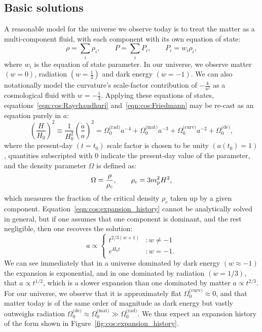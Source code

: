 \subsection{Basic solutions}
A reasonable model for the universe we observe today is to treat the matter as a multi-component fluid, with each component with its own equation of state:
\begin{equation}
  \rho = \sum_i \rho_i, \qquad P = \sum_i P_i, \qquad P_i = w_i \rho_i,
  \label{eqn:cos:multi_component}
\end{equation}
where \(w_i\) is the equation of state parameter. In our universe, we observe matter \((w=0)\), radiation \((w=\frac{1}{3})\) and dark energy \((w=-1)\). We can also notationally model the curvature's scale-factor contribution of \(-\frac{k}{a^2}\) as a cosmological fluid with \(w=-\frac{1}{3}\). Applying these equations of states, equations~\eqref{eqn:cos:Raychaudhuri} and~\eqref{eqn:cos:Friedmann} may be re-cast as an equation purely in \(a\):
\begin{equation}
  {\left( \frac{H}{H_0} \right)}^2 \equiv 
  \frac{1}{H_0^2}{\left( \frac{\dot{a}}{a} \right)}^2 =
  \Omega^\text{(rad)}_0 a^{-4} +
  \Omega^\text{(mat)}_0 a^{-3} + 
  \Omega^\text{(curv)}_0 a^{-2} +
  \Omega^\text{(de)}_0,
  \label{eqn:cos:expansion_history}
\end{equation}
where the present-day \((t=t_0)\) scale factor is chosen to be unity \((a(t_0)=1)\), quantities subscripted with \(0\) indicate the present-day  value of the parameter, and the density parameter \(\Omega\) is defined as:
\begin{equation}
  \Omega = \frac{\rho}{\rho_\mathrm{c}}, \qquad \rho_\mathrm{c} = {3m_{\mathrm{p}}^2H^2},
  \label{eqn:cos:omega_def}
\end{equation}
which measures the fraction of the critical density \(\rho_c\) taken up by a given component. Equation~\eqref{eqn:cos:expansion_history} cannot be analytically solved in general, but if one assumes that one component is dominant, and the rest negligible, then one recovers the solution:
\begin{equation}
  a  \propto
  \left\{
  \begin{array}{ll}
    t^{2/3(w+1)} &: w\ne-1\\
    e^{H_0 t} &: w=-1.\\
  \end{array}
  \right.
\end{equation}
We can see immediately that in a universe dominated by dark energy \({(w\approx-1)}\) the expansion is exponential, and in one dominated by radiation \({(w=1/3)}\), that \({a\propto t^{1/2}}\), which is a slower expansion than one dominated by matter \({a\propto t^{2/3}}\). For our universe, we observe that it is approximately flat \({\Omega_0^{\text{(curv)}}\approx0}\), and that matter today is of the same order of magnitude as dark energy but vastly outweighs radiation \({\Omega_0^{\text{(de)}} \approx \Omega_0^{\text{(mat)}} \gg \Omega_0^{\text{(rad)}}}\). We thus expect an expansion history of the form shown in Figure~\ref{fig:cos:expansion_history}.

